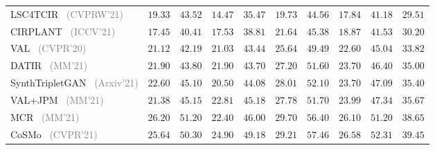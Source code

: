 \begin{table*}
\begin{tabular}{l|cc|cc|cc|cc|c}
    LSC4TCIR~\cite{chawla2021lsc4cir} \footnotesize{\textcolor{gray}{(CVPRW'21)}} & $19.33 $ & $43.52$ & $14.47$ & $35.47$ & $19.73$ & $44.56$ & $17.84$ & $41.18$ &$29.51$ \\
    CIRPLANT~\cite{liu2021CIRPLANT} \footnotesize{\textcolor{gray}{(ICCV'21)}} & $17.45$ & $40.41$ & $17.53$ & $38.81$ & $21.64$ & $45.38$ & $18.87$ & $41.53$ & $30.20$ \\
    VAL~\cite{chen2020val} \footnotesize{\textcolor{gray}{(CVPR'20)}} & $21.12$ & $42.19$ & $21.03$ & $43.44$ & $25.64$ & $49.49$ & $22.60$ & $45.04$ & $33.82$ \\
    DATIR~\cite{gu2021datir} \footnotesize{\textcolor{gray}{(MM'21)}} & $21.90$ & $43.80$ & $21.90$ & $43.70$ & $27.20$ & $51.60$ & $23.70$ & $46.40$ & $35.00$ \\
    SynthTripletGAN~\cite{tautkute2021Synth} \footnotesize{\textcolor{gray}{(Arxiv'21)}} & $22.60$ & $45.10$ & $20.50$ & $44.08$ & $28.01$ & $52.10$ & $23.70$ & $47.09$ & $35.40$ \\
    VAL+JPM~\cite{yang2021jpm} \footnotesize{\textcolor{gray}{(MM'21)}} & $21.38$ & $45.15$ & $22.81$ & $45.18$ & $27.78$ & $51.70$ & $23.99$ & $47.34$ & $35.67$ \\
    MCR~\cite{zhang2021mcr} \footnotesize{\textcolor{gray}{(MM'21)}} & $26.20$ & $51.20$ & $22.40$ & $46.00$ & $29.70$ & $56.40$ & $26.10$ & $51.20$ & $38.65$ \\
    CoSMo~\cite{lee2021cosmo} \footnotesize{\textcolor{gray}{(CVPR'21)}} & $25.64$ & $50.30$ & $24.90$ & $49.18$ & $29.21$ & $57.46$ & $26.58$ & $52.31$ & $39.45$ \\

\end{tabular}
\end{table*}
